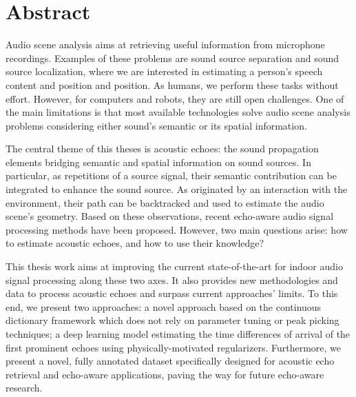 \chapter*{Abstract}

Audio scene analysis aims at retrieving useful information from microphone recordings.
Examples of these problems are sound source separation and sound source localization, where we are interested in estimating a person's speech content and position and position.
As humans, we perform these tasks without effort. However, for computers and robots, they are still open challenges.
One of the main limitations is that most available technologies solve audio scene analysis problems considering either sound's semantic or its spatial information.

\mynewline
The central theme of this theses is acoustic echoes: the sound propagation elements bridging semantic and spatial information on sound sources.
In particular, as repetitions of a source signal, their semantic contribution can be integrated to enhance the sound source.
As originated by an interaction with the environment, their path can be backtracked and used to estimate the audio scene's geometry.
Based on these observations, recent echo-aware audio signal processing methods have been proposed.
However, two main questions arise: how to estimate acoustic echoes, and how to use their knowledge?

\mynewline
This thesis work aims at improving the current state-of-the-art for indoor audio signal processing along these two axes.
It also provides new methodologies and data to process acoustic echoes and surpass current approaches' limits.
To this end, we present two approaches:
a novel approach based on the  continuous dictionary framework which does not rely on parameter tuning or peak picking techniques;
a deep learning model estimating the time differences of arrival of the first prominent echoes using physically-motivated regularizers.
Furthermore, we present a novel, fully annotated dataset specifically designed for acoustic echo retrieval and echo-aware applications, paving the way for future echo-aware research.

